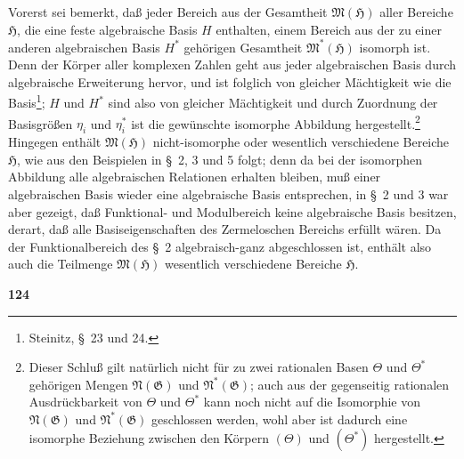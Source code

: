 \documentclass[12pt,a4paper]{article}
\begin{document}
Vorerst sei bemerkt, da\ss{} jeder Bereich aus der Gesamtheit $\mathfrak{M}(\mathfrak{H})$ aller Bereiche $\mathfrak{H}$, die eine feste algebraische Basis $H$ enthalten, einem Bereich aus der zu einer anderen algebraischen Basis $H^*$ geh\"origen Gesamtheit $\mathfrak{M}^*(\mathfrak{H})$ isomorph ist. Denn der K\"orper aller komplexen Zahlen geht aus jeder algebraischen Basis durch algebraische Erweiterung hervor, und ist folglich von gleicher M\"achtigkeit wie die Basis\footnote{Steinitz, \S\ 23 und 24.}; $H$ und $H^*$ sind also von gleicher M\"achtigkeit und durch Zuordnung der Basisgr\"o\ss en $\eta_i$ und $\eta_i^*$ ist die gew\"unschte isomorphe Abbildung hergestellt.\footnote{Dieser Schlu\ss{} gilt nat\"urlich nicht f\"ur zu zwei rationalen Basen $\Theta$ und $\Theta^*$ geh\"origen Mengen $\mathfrak{N}(\mathfrak{G})$ und $\mathfrak{N}^*(\mathfrak{G})$; auch aus der gegenseitig rationalen Ausdr\"uckbarkeit von $\Theta$ und $\Theta^*$ kann noch nicht auf die Isomorphie von $\mathfrak{N}(\mathfrak{G})$ und $\mathfrak{N}^*(\mathfrak{G})$ geschlossen werden, wohl aber ist dadurch eine isomorphe Beziehung zwischen den K\"orpern $(\Theta)$ und $(\Theta^*)$ hergestellt.} Hingegen enth\"alt $\mathfrak{M}(\mathfrak{H})$ nicht-isomorphe oder wesentlich verschiedene Bereiche $\mathfrak{H}$, wie aus den Beispielen in \S\ 2, 3 und 5 folgt; denn da bei der isomorphen Abbildung alle algebraischen Relationen erhalten bleiben, mu\ss{} einer algebraischen Basis wieder eine algebraische Basis entsprechen, in \S\ 2 und 3 war aber gezeigt, da\ss{} Funktional- und Modulbereich keine algebraische Basis besitzen, derart, da\ss{} alle Basiseigenschaften des Zermeloschen Bereichs erf\"ullt w\"aren. Da der Funktionalbereich des \S\ 2 algebraisch-ganz abgeschlossen ist, enth\"alt also auch die Teilmenge $\mathfrak{M}(\mathfrak{H})$ wesentlich verschiedene Bereiche $\mathfrak{H}$.

\newpage
\begin{center}
\textbf{124}
\end{center}
\end{document}
